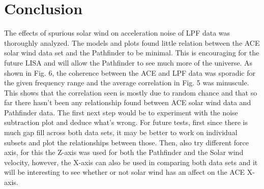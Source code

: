 \documentclass[%
 reprint,
 amsmath,amssymb,
 aps,
]{revtex4-2}
\begin{document}
\section{Conclusion}
The effects of spurious solar wind on acceleration noise of LPF data was thoroughly analyzed. The models and plots found little relation between the ACE solar wind data set and the Pathfinder to be minimal. This is encouraging for the future LISA and will allow the Pathfinder to see much more of the universe. As shown in Fig. 6, the coherence between the ACE and LPF data was sporadic for the given frequency range and the average correlation in Fig. 5 was minuscule. This shows that the correlation seen is mostly due to random chance and that so far there hasn't been any relationship found between ACE solar wind data and Pathfinder data. The first next step would be to experiment with the noise subtraction plot and deduce what's wrong.  For future tests, first since there is much gap fill across both data sets, it may be better to work on individual subsets and plot the relationships between those. Then, also try different force axis, for this the Z-axis was used for both the Pathfinder and the Solar wind velocity, however, the X-axis can also be used in comparing both data sets and it will be interesting to see whether or not solar wind has an affect on the ACE X-axis.




\nocite{*}

\end{document}
